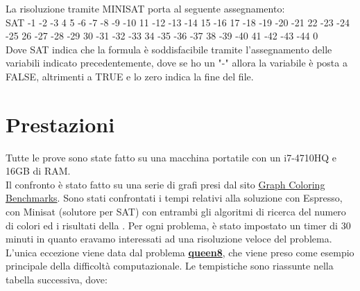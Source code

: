 \documentclass[a4paper,11pt]{article} %
\begin{document}
La risoluzione tramite MINISAT porta al seguente assegnamento:\\
SAT
-1 -2 -3 4 5 -6 -7 -8 -9 -10 11 -12 -13 -14 15 -16 17 -18 -19 -20 -21 22 -23 -24 -25 26 -27 -28 -29 30 -31 -32 -33 34 -35 -36 -37 38 -39 -40 41 -42 -43 -44 0\\
Dove SAT indica che la formula è soddisfacibile tramite l'assegnamento delle variabili indicato precedentemente, dove se ho un "-" allora la variabile è posta a FALSE, altrimenti a TRUE e lo zero indica la fine del file.

\pagebreak

\section{Prestazioni}
Tutte le prove sono state fatto su una macchina portatile con un i7-4710HQ e 16GB di RAM.\\
Il confronto è stato fatto su una serie di grafi presi dal sito \href{https://sites.google.com/site/graphcoloring/vertex-coloring}{Graph Coloring Benchmarks}\cite{site}. Sono stati confrontati i tempi relativi alla soluzione con Espresso, con Minisat \cite{minisat} (solutore per SAT) con entrambi gli algoritmi di ricerca del numero di colori ed i risultati della \cite{tesi}.
Per ogni problema, è stato impostato un timer di 30 minuti in quanto eravamo interessati ad una risoluzione veloce del problema. L'unica eccezione viene data dal problema \href{https://it.wikipedia.org/wiki/Rompicapo_delle_otto_regine}{\textbf{queen8}}, che viene preso come esempio principale della difficoltà computazionale.
Le tempistiche sono riassunte nella tabella successiva, dove:
\end{document}
